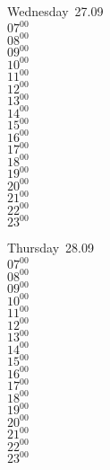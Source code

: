 \documentclass[11pt, a4paper]{book}\usepackage[]{graphicx}\usepackage[]{color}
\begin{document}
\begin{weekdaybox}
  Wednesday~27.09\\
  { 
  \vfill
  $07^{00}$\\
$08^{00}$\\
$09^{00}$\\
$10^{00}$\\
$11^{00}$\\
$12^{00}$\\
$13^{00}$\\
$14^{00}$\\
$15^{00}$\\
$16^{00}$\\
$17^{00}$\\
$18^{00}$\\
$19^{00}$\\
$20^{00}$\\
$21^{00}$\\
$22^{00}$\\
$23^{00}$\\
  }
\end{weekdaybox}
\clearpage
\begin{headerbox}
\end{headerbox}
\begin{weekdaybox}
  Thursday~28.09\\
  { 
  \vfill
  $07^{00}$\\
$08^{00}$\\
$09^{00}$\\
$10^{00}$\\
$11^{00}$\\
$12^{00}$\\
$13^{00}$\\
$14^{00}$\\
$15^{00}$\\
$16^{00}$\\
$17^{00}$\\
$18^{00}$\\
$19^{00}$\\
$20^{00}$\\
$21^{00}$\\
$22^{00}$\\
$23^{00}$\\
  }
\end{weekdaybox} 
\end{document}
